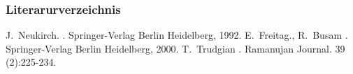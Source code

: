 \begin{frame}
    \frametitle{Literarurverzeichnis}

    \begin{thebibliography}{Freitag und Busam, 2000}
            J.~Neukirch.
            .
            \newblock Springer-Verlag Berlin Heidelberg, 1992.
            E.~Freitag., R.~Busam
            .
            \newblock Springer-Verlag Berlin Heidelberg, 2000.
            T.~Trudgian
            .
            \newblock Ramanujan Journal. 39 (2):225-234.
    \end{thebibliography}

\end{frame}